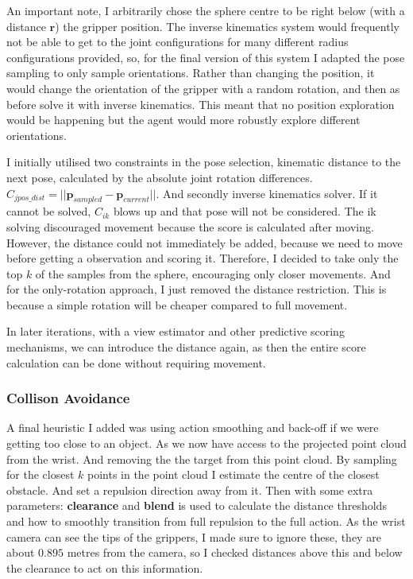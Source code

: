 An important note, I arbitrarily chose the sphere centre to be right below (with a distance $\mathbf{r}$) the gripper position. The inverse kinematics system would frequently not be able to get to the joint configurations for many different radius configurations provided, so, for the final version of this system I adapted the pose sampling to only sample orientations. Rather than changing the position, it would change the orientation of the gripper with a random rotation, and then as before solve it with inverse kinematics. This meant that no position exploration would be happening but the agent would more robustly explore different orientations. 

I initially utilised two constraints in the pose selection, kinematic distance to the next pose, calculated by the absolute joint rotation differences. \(C_{jpos\_dist} = ||\mathbf{p}_{sampled} - \mathbf{p}_{current}||\). And secondly inverse kinematics solver. If it cannot be solved, \(C_{ik}\) blows up and that pose will not be considered. The ik solving discouraged movement because the score is calculated after moving. However, the distance could not immediately be added, because we need to move before getting a observation and scoring it. Therefore, I decided to take only the top $k$ of the samples from the sphere, encouraging only closer movements. And for the only-rotation approach, I just removed the distance restriction. This is because a simple rotation will be cheaper compared to full movement.

In later iterations, with a view estimator and other predictive scoring mechanisms, we can introduce the distance again, as then the entire score calculation can be done without requiring movement.

\subsubsection{Collison Avoidance}
A final heuristic I added was using action smoothing and back-off if we were getting too close to an object. As we now have access to the projected point cloud from the wrist. And removing the the target from this point cloud. By sampling for the closest $k$ points in the point cloud I estimate the centre of the closest obstacle. And set a repulsion direction away from it.
Then with some extra parameters: \textbf{clearance} and \textbf{blend} is used to calculate the distance thresholds and how to smoothly transition from full repulsion to the full action. As the wrist camera can see the tips of the grippers, I made sure to ignore these, they are about $0.895$ metres from the camera, so I checked distances above this and below the clearance to act on this information. 


